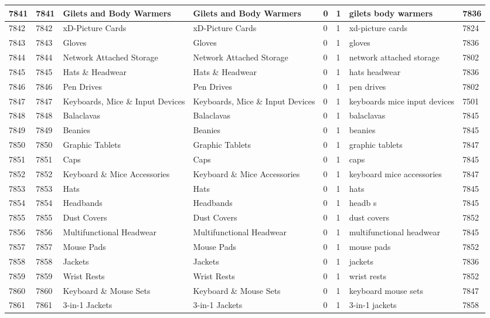\begin{longtable}{|l|l|l|l|l|l|l|l|}
7841 & 7841 & Gilets and Body Warmers & Gilets and Body Warmers & 0 & 1 & gilets body warmers & 7836 \\ \hline 
7842 & 7842 & xD-Picture Cards & xD-Picture Cards & 0 & 1 & xd-picture cards & 7824 \\ \hline 
7843 & 7843 & Gloves & Gloves & 0 & 1 & gloves & 7836 \\ \hline 
7844 & 7844 & Network Attached Storage & Network Attached Storage & 0 & 1 & network attached storage & 7802 \\ \hline 
7845 & 7845 & Hats \& Headwear & Hats \& Headwear & 0 & 1 & hats headwear & 7836 \\ \hline 
7846 & 7846 & Pen Drives & Pen Drives & 0 & 1 & pen drives & 7802 \\ \hline 
7847 & 7847 & Keyboards, Mice \& Input Devices & Keyboards, Mice \& Input Devices & 0 & 1 & keyboards mice input devices & 7501 \\ \hline 
7848 & 7848 & Balaclavas & Balaclavas & 0 & 1 & balaclavas & 7845 \\ \hline 
7849 & 7849 & Beanies & Beanies & 0 & 1 & beanies & 7845 \\ \hline 
7850 & 7850 & Graphic Tablets & Graphic Tablets & 0 & 1 & graphic tablets & 7847 \\ \hline 
7851 & 7851 & Caps & Caps & 0 & 1 & caps & 7845 \\ \hline 
7852 & 7852 & Keyboard \& Mice Accessories & Keyboard \& Mice Accessories & 0 & 1 & keyboard mice accessories & 7847 \\ \hline 
7853 & 7853 & Hats & Hats & 0 & 1 & hats & 7845 \\ \hline 
7854 & 7854 & Headbands & Headbands & 0 & 1 & headb s & 7845 \\ \hline 
7855 & 7855 & Dust Covers & Dust Covers & 0 & 1 & dust covers & 7852 \\ \hline 
7856 & 7856 & Multifunctional Headwear & Multifunctional Headwear & 0 & 1 & multifunctional headwear & 7845 \\ \hline 
7857 & 7857 & Mouse Pads & Mouse Pads & 0 & 1 & mouse pads & 7852 \\ \hline 
7858 & 7858 & Jackets & Jackets & 0 & 1 & jackets & 7836 \\ \hline 
7859 & 7859 & Wrist Rests & Wrist Rests & 0 & 1 & wrist rests & 7852 \\ \hline 
7860 & 7860 & Keyboard \& Mouse Sets & Keyboard \& Mouse Sets & 0 & 1 & keyboard mouse sets & 7847 \\ \hline 
7861 & 7861 & 3-in-1 Jackets & 3-in-1 Jackets & 0 & 1 & 3-in-1 jackets & 7858 \\ \hline 

\end{longtable}
